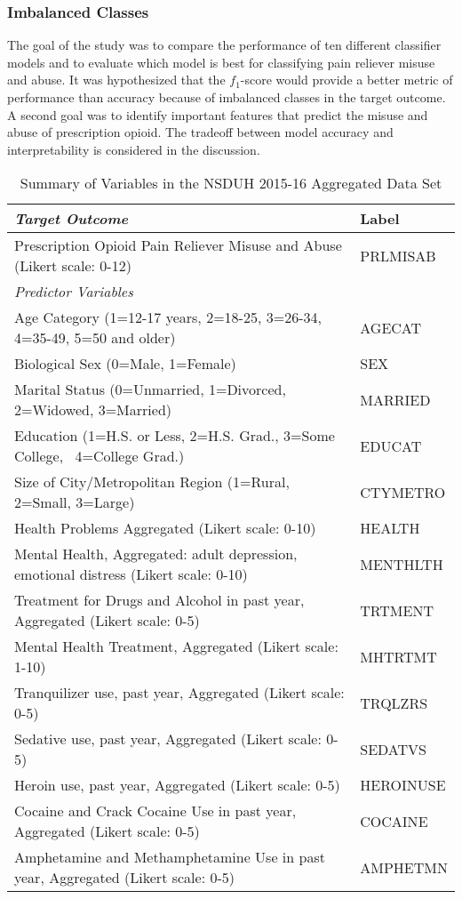 \documentclass[sigconf]{acmart}
\begin{document}
\subsubsection{Imbalanced Classes}

The goal of the study was to compare the performance of ten different 
classifier models and to evaluate which model is best for classifying pain 
reliever misuse and abuse. It was hypothesized that the $f_1$-score would 
provide a better metric of performance than accuracy because of imbalanced
classes in the target outcome. A second goal was to identify important features 
that predict the misuse and abuse of prescription opioid. The tradeoff 
between model accuracy and interpretability is considered in the discussion. 


\begin{table*}[ht]
  \caption{Summary of Variables in the NSDUH 2015-16 Aggregated Data Set}
  \label{tab:freq}
  \begin{tabular}{ll}
    \toprule
    \textit{Target Outcome} & Label \\
    \midrule
    Prescription Opioid Pain Reliever Misuse and Abuse (Likert scale: 0-12)& PRLMISAB  \\
    \midrule
    \textit{Predictor Variables}&   \\
    \midrule
    Age Category (1=12-17 years, 2=18-25, 3=26-34, 4=35-49, 5=50 and older)& AGECAT \\
    Biological Sex (0=Male, 1=Female)& SEX  \\
    Marital Status (0=Unmarried, 1=Divorced, 2=Widowed, 3=Married)& MARRIED  \\
    Education (1=H.S. or Less, 2=H.S. Grad., 3=Some College,  4=College Grad.)& EDUCAT  \\
    Size of City/Metropolitan Region (1=Rural, 2=Small, 3=Large)& CTYMETRO  \\
    Health Problems Aggregated  (Likert scale: 0-10)& HEALTH  \\
    Mental Health, Aggregated: adult depression, emotional distress (Likert scale: 0-10)& MENTHLTH  \\
    Treatment for Drugs and Alcohol in past year, Aggregated (Likert scale: 0-5)& TRTMENT  \\
    Mental Health Treatment, Aggregated (Likert scale: 1-10)& MHTRTMT  \\
    Tranquilizer use, past year, Aggregated (Likert scale: 0-5)& TRQLZRS \\
    Sedative use, past year, Aggregated (Likert scale: 0-5)& SEDATVS  \\
    Heroin use, past year, Aggregated (Likert scale: 0-5)& HEROINUSE  \\
    Cocaine and Crack Cocaine Use in past year, Aggregated  (Likert scale: 0-5)& COCAINE  \\
    Amphetamine and Methamphetamine Use in past year, Aggregated (Likert scale: 0-5)& AMPHETMN  \\
    \bottomrule
  \end{tabular}
\end{table*}
\end{document}

